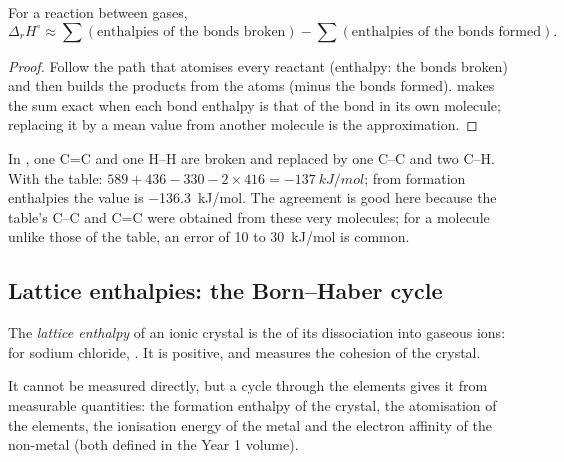 \begin{proposition}\label{prop:b2:reaction-enthalpy:bond-estimate}
For a reaction between gases,
\[
  \Delta_r H^\circ \approx \sum(\text{enthalpies of the bonds broken}) -
  \sum(\text{enthalpies of the bonds formed}).
\]
\end{proposition}

\begin{proof}
Follow the path that atomises every reactant (enthalpy: the bonds broken)
and then builds the products from the atoms (minus the bonds formed).  makes the sum exact when each bond enthalpy is that of the bond in its
own molecule; replacing it by a mean value from another molecule is the
approximation.
\end{proof}

\begin{example}\label{ex:b2:reaction-enthalpy:hydrogenation}
In , one C=C and one H--H are broken and
replaced by one C--C and two C--H. With the table: $589 + 436 - 330 - 2
\times 416 = \qty{-137}{kJ/mol}$; from formation enthalpies the value is
\qty{-136.3}{kJ/mol}. The agreement is good here because the table's C--C
and C=C were obtained from these very molecules; for a molecule unlike
those of the table, an error of 10 to \qty{30}{kJ/mol} is common.
\end{example}

\subsection*{Lattice enthalpies: the Born--Haber cycle}

\begin{definition}\label{def:b2:reaction-enthalpy:lattice-enthalpy}
The \emph{lattice enthalpy} of an ionic crystal is
the  of its dissociation into gaseous ions: for
sodium chloride, . It is positive, and
measures the cohesion of the crystal.
\end{definition}

It cannot be measured directly, but a cycle through the elements gives it
from measurable quantities: the formation enthalpy of the crystal, the
atomisation of the elements, the ionisation energy of the metal and the
electron affinity of the non-metal (both defined in the Year 1 volume).

